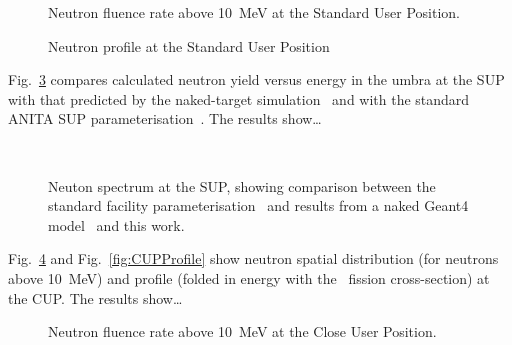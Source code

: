 \documentclass[12pt,journal]{IEEEtran}
\let\MYoriglatexcaption\caption
\renewcommand{\caption}[2][\relax]{\MYoriglatexcaption[#2]{#2}}
\def\U238{\BPChem{\^{238}U}}
\begin{document}
\begin{figure}[t]
    \vspace{2in}
    \caption{Neutron fluence rate above \SI{10}{\MeV} at the Standard User Position.}
    \label{fig:SUPDensity}
\end{figure}

\begin{figure}[t]
    \vspace{2in}
    \caption{Neutron profile at the Standard User Position}
    \label{fig:SUPProfile}
\end{figure}

Fig.~\ref{fig:SUPSpectraComparison} compares calculated neutron yield versus energy in the umbra at the SUP with that predicted by the naked-target simulation~\cite{Platt13} and with the standard ANITA SUP parameterisation~\cite{Prokofiev2009}.
The results show\ldots{}

\begin{figure}[t]
    \vspace{2in}
	\\
    \vspace{2in}
	\caption{Neuton spectrum at the SUP, showing comparison between the standard facility parameterisation~\cite{Prokofiev2009} and results from a naked Geant4 model~\cite{Platt13} and this work.}
	\label{fig:SUPSpectraComparison}
\end{figure}

Fig.~\ref{fig:CUPDensity} and Fig.~\ref{fig:CUPProfile} show neutron spatial distribution (for neutrons above \SI{10}{\MeV}) and profile (folded in energy with the \U238\ fission cross-section) at the CUP.
The results show\ldots{}

\begin{figure}[t]
    \vspace{2in}
    \caption{Neutron fluence rate above \SI{10}{\MeV} at the Close User Position.}
    \label{fig:CUPDensity}
\end{figure}
\end{document}

